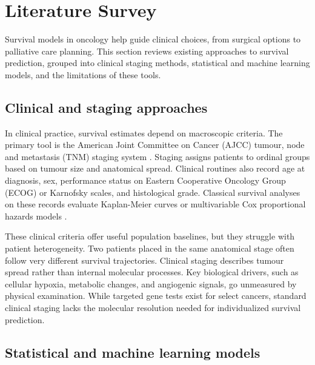 \documentclass[10pt,a4paper]{article}
\begin{document}
\section{Literature Survey}

\label{sec:literature_survey}

Survival models in oncology help guide clinical choices, from surgical options to palliative care planning. This section reviews existing approaches to survival prediction, grouped into clinical staging methods, statistical and machine learning models, and the limitations of these tools.

\subsection{Clinical and staging approaches}
\label{sec:lit_clinical}

In clinical practice, survival estimates depend on macroscopic criteria. The primary tool is the American Joint Committee on Cancer (AJCC) tumour, node and metastasis (TNM) staging system \citep{amin2017ajcc}. Staging assigns patients to ordinal groups based on tumour size and anatomical spread. Clinical routines also record age at diagnosis, sex, performance status on Eastern Cooperative Oncology Group (ECOG) or Karnofsky scales, and histological grade. Classical survival analyses on these records evaluate Kaplan-Meier curves \citep{kaplan1958nonparametric} or multivariable Cox proportional hazards models \citep{cox1972regression}.

These clinical criteria offer useful population baselines, but they struggle with patient heterogeneity. Two patients placed in the same anatomical stage often follow very different survival trajectories. Clinical staging describes tumour spread rather than internal molecular processes. Key biological drivers, such as cellular hypoxia, metabolic changes, and angiogenic signals, go unmeasured by physical examination. While targeted gene tests exist for select cancers, standard clinical staging lacks the molecular resolution needed for individualized survival prediction.

\subsection{Statistical and machine learning models}
\label{sec:lit_ml_statistical}
\end{document}
